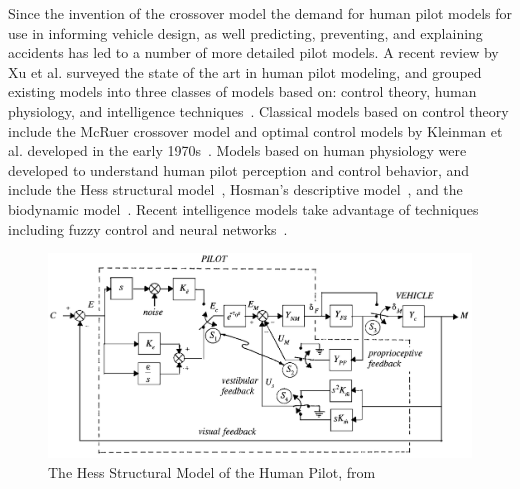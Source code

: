 \documentclass[float=false, crop=false]{standalone}
\begin{document}
Since the invention of the crossover model the demand for human pilot models for use in informing vehicle design, as well predicting, preventing, and explaining accidents has led to a number of more detailed pilot models.
A recent review by Xu et al. surveyed the state of the art in human pilot modeling, and grouped existing models into three classes of models based on: control theory, human physiology, and intelligence techniques~\cite{Xu2017}.
Classical models based on control theory include the McRuer crossover model and optimal control models by Kleinman et al. developed in the early 1970s~\cite{Kleinman1970, Baron1970}.
Models based on human physiology were developed to understand human pilot perception and control behavior, and include the Hess structural model~\cite{Hess1980, Hess1990, Hess1997}, Hosman's descriptive model~\cite{Hosman1996, Hosman1999}, and the biodynamic model~\cite{Griffin2001}.
Recent intelligence models take advantage of techniques including fuzzy control and neural networks~\cite{Zaychik2006, Gestwa}.

\begin{figure}[tb!]
    \begin{center}
        \includegraphics[width=0.8\linewidth]{./../img/Screen Shot 2018-07-31 at 11.21.44 AM.png}
        \caption{The Hess Structural Model of the Human Pilot, from~\cite{Hess1997}}
        \label{figure:structuralmodel}
    \end{center}
\end{figure}
\end{document}
